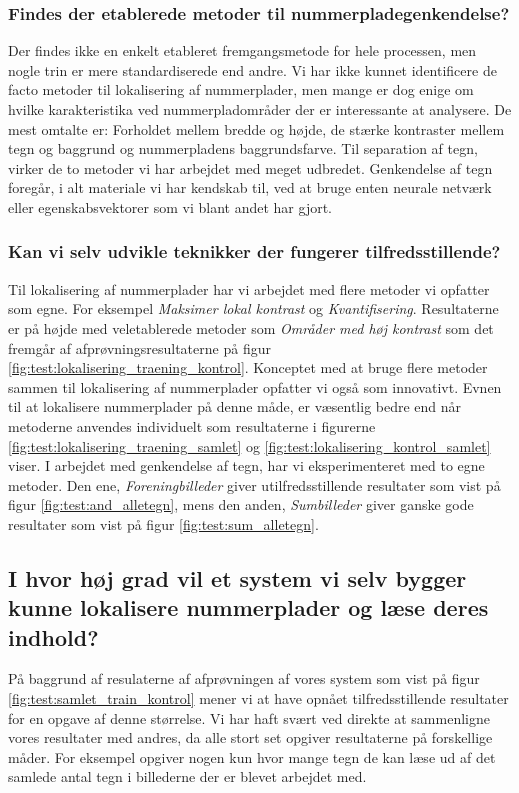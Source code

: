 \documentclass[11pt,a4paper,final]{article}
\begin{document}
\subsubsection*{Findes der etablerede metoder til nummerpladegenkendelse?}
Der findes ikke en enkelt etableret fremgangsmetode for hele processen, men nogle trin er mere standardiserede end andre. Vi har ikke kunnet identificere de facto metoder til lokalisering af nummerplader, men mange er dog enige om hvilke karakteristika ved nummerpladområder der er interessante at analysere. De mest omtalte er: Forholdet mellem bredde og højde, de stærke kontraster mellem tegn og baggrund og nummerpladens baggrundsfarve. Til separation af tegn, virker de to metoder vi har arbejdet med meget udbredet. Genkendelse af tegn foregår, i alt materiale vi har kendskab til, ved at bruge enten neurale netværk eller egenskabsvektorer som vi blant andet har gjort.    

\subsubsection*{Kan vi selv udvikle teknikker der fungerer tilfredsstillende?}
Til lokalisering af nummerplader har vi arbejdet med flere metoder vi opfatter som egne. For eksempel \textit{Maksimer lokal kontrast} og \textit{Kvantifisering}. Resultaterne er på højde med veletablerede metoder som \textit{Områder med høj kontrast} som det fremgår af afprøvningsresultaterne på figur \vref{fig:test:lokalisering_traening_kontrol}. Konceptet med at bruge flere metoder sammen til lokalisering af nummerplader opfatter vi også som innovativt. Evnen til at lokalisere nummerplader på denne måde, er væsentlig bedre end når metoderne anvendes individuelt som resultaterne i figurerne \ref{fig:test:lokalisering_traening_samlet} og \vref{fig:test:lokalisering_kontrol_samlet} viser. I arbejdet med genkendelse af tegn, har vi eksperimenteret med to egne metoder. Den ene, \textit{Foreningbilleder} giver utilfredsstillende resultater som vist på figur \vref{fig:test:and_alletegn}, mens den anden, \textit{Sumbilleder} giver ganske gode resultater som vist på figur \vref{fig:test:sum_alletegn}.

\subsection*{I hvor høj grad vil et system vi selv bygger kunne lokalisere nummerplader og læse deres indhold?}
På baggrund af resulaterne af afprøvningen af vores system som vist på figur \vref{fig:test:samlet_train_kontrol} mener vi at have opnået tilfredsstillende resultater for en opgave af denne størrelse. Vi har haft svært ved direkte at sammenligne vores resultater med andres, da alle stort set opgiver resultaterne på forskellige måder. For eksempel opgiver nogen kun hvor mange tegn de kan læse ud af det samlede antal tegn i billederne der er blevet arbejdet med.  
\end{document}
